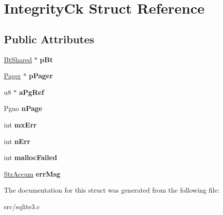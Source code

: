 \hypertarget{struct_integrity_ck}{\section{Integrity\-Ck Struct Reference}
\label{struct_integrity_ck}
}
\subsection*{Public Attributes}
\begin{DoxyCompactItemize}
\item 
\hypertarget{struct_integrity_ck_a65f03f54514f504bd871bb2ccd3da188}{\hyperlink{struct_bt_shared}{Bt\-Shared} $\ast$ {\bfseries p\-Bt}}\label{struct_integrity_ck_a65f03f54514f504bd871bb2ccd3da188}

\item 
\hypertarget{struct_integrity_ck_a87e7f8b012b61b61fae359269cbacce4}{\hyperlink{struct_pager}{Pager} $\ast$ {\bfseries p\-Pager}}\label{struct_integrity_ck_a87e7f8b012b61b61fae359269cbacce4}

\item 
\hypertarget{struct_integrity_ck_a317f80aef5842ad69df75b55e14118d1}{u8 $\ast$ {\bfseries a\-Pg\-Ref}}\label{struct_integrity_ck_a317f80aef5842ad69df75b55e14118d1}

\item 
\hypertarget{struct_integrity_ck_a04f496ef7239aea6dccb6a861bb5a798}{Pgno {\bfseries n\-Page}}\label{struct_integrity_ck_a04f496ef7239aea6dccb6a861bb5a798}

\item 
\hypertarget{struct_integrity_ck_a9daa97cdcb1366c503451ab2af9e7ba6}{int {\bfseries mx\-Err}}\label{struct_integrity_ck_a9daa97cdcb1366c503451ab2af9e7ba6}

\item 
\hypertarget{struct_integrity_ck_a52c815a1d19be87d0ab4dc0a4e4d38e2}{int {\bfseries n\-Err}}\label{struct_integrity_ck_a52c815a1d19be87d0ab4dc0a4e4d38e2}

\item 
\hypertarget{struct_integrity_ck_a8e448c1d6483a0326a7ec39291782030}{int {\bfseries malloc\-Failed}}\label{struct_integrity_ck_a8e448c1d6483a0326a7ec39291782030}

\item 
\hypertarget{struct_integrity_ck_a1e9b79bb1d7b22a840001333200a950e}{\hyperlink{struct_str_accum}{Str\-Accum} {\bfseries err\-Msg}}\label{struct_integrity_ck_a1e9b79bb1d7b22a840001333200a950e}

\end{DoxyCompactItemize}


The documentation for this struct was generated from the following file\-:\begin{DoxyCompactItemize}
\item 
src/sqlite3.\-c\end{DoxyCompactItemize}
